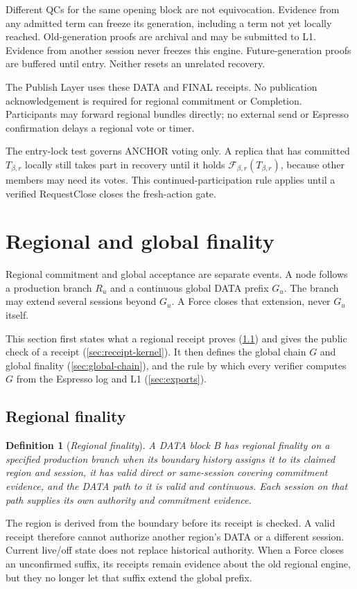 \documentclass[11pt,a4paper]{article}
\newcommand{\RR}[1]{{\color{rrRed}#1}}
\newcommand{\FC}{\mathcal F}
\newcommand{\defterm}[1]{\textcolor{rrBlue}{\textit{#1}}}
\newtheorem{definition}{Definition}[section]
\begin{document}
Different QCs for the same opening block are not equivocation. Evidence
from any admitted term can freeze its generation, including a term not
yet locally reached. Old-generation proofs are archival and may be
submitted to L1. \RR{Evidence from another session never freezes this
engine.} Future-generation proofs are buffered until entry. Neither
resets an unrelated recovery.

The Publish Layer uses these DATA and FINAL receipts. No publication
acknowledgement is required for regional commitment or Completion.
Participants may forward regional bundles directly; no external send
or Espresso confirmation delays a regional vote or timer.

The entry-lock test governs ANCHOR voting only. A replica that has
committed $T_{\beta,r}$ locally still takes part in recovery until it holds
$\FC_{\beta,r}(T_{\beta,r})$, because other members may need its votes. This continued-participation
rule applies until a verified RequestClose closes the fresh-action gate.

\section{Regional and global finality}
\label{sec:external}
Regional commitment and global acceptance are separate events. A node
follows a production branch $R_u$ and a continuous global DATA prefix
$G_u$. The branch may extend several sessions beyond $G_u$. A Force
closes that extension, never $G_u$ itself.

This section first states what a regional receipt proves
(\cref{sec:regional-finality}) and gives the public check of a receipt
(\cref{sec:receipt-kernel}). It then defines the global chain $G$ and
global finality (\cref{sec:global-chain}), and the rule by which every
verifier computes $G$ from the Espresso log and L1
(\cref{sec:exports}).

\subsection{Regional finality}
\label{sec:regional-finality}
\begin{definition}[\defterm{Regional finality}]
\label{def:regional-finality}
A DATA block $B$ has regional finality on a specified production branch
when its boundary history assigns it to its claimed region and session,
it has valid direct or same-session covering commitment evidence, and
the DATA path to it is valid and continuous. Each session on that path
supplies its own authority and commitment evidence.
\end{definition}
The region is derived from the boundary before its receipt is checked.
A valid receipt therefore cannot authorize another region's DATA or a
different session. Current live/off state does not replace historical
authority. When a Force closes an unconfirmed suffix, its receipts remain
evidence about the old regional engine, but they no longer let that
suffix extend the global prefix.
\end{document}
